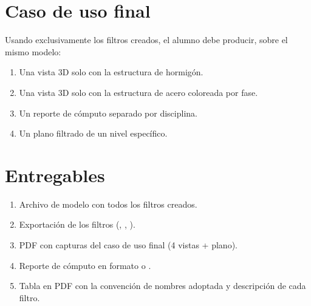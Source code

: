 \documentclass[11pt,a4paper]{article}
\begin{document}
\section{Caso de uso final}
Usando exclusivamente los filtros creados, el alumno debe producir, sobre el mismo modelo:
\begin{enumerate}
    \item Una vista 3D solo con la estructura de hormigón.
    \item Una vista 3D solo con la estructura de acero coloreada por fase.
    \item Un reporte de cómputo separado por disciplina.
    \item Un plano filtrado de un nivel específico.
\end{enumerate}

\section{Entregables}
\begin{entregable}
\begin{enumerate}
    \item Archivo de modelo  con todos los filtros creados.
    \item Exportación de los filtros (, , ).
    \item PDF con capturas del caso de uso final (4 vistas + plano).
    \item Reporte de cómputo en formato  o .
    \item Tabla en PDF con la convención de nombres adoptada y descripción de cada filtro.
\end{enumerate}
\end{entregable}

\end{document}
